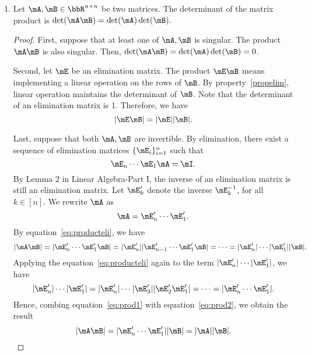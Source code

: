 \documentclass[11pt]{article}
\theoremstyle{plain}
\theoremstyle{definition}
\begin{document}
\begin{enumerate}
\begin{proof}
		($\Leftarrow$) If the determinant $\det(\mA) = 0$, the determinant of $RREF(\mA)$ is 0. Since the reduced row echelon form  of a matrix contains only distinct nonzero rows, the zero determinant implies that there exists at least one zero row in $RREF(\mA)$. Therefore, the matrix $\mA$ is singular.
	\end{proof}

	
	\item\label{propproduct} Let  $\mA, \mB \in \bbR^{n \times n}$ be two matrices. The determinant of the matrix product is $\det(\mA \mB) = \det(\mA) \det(\mB).$
	
	\begin{proof}
		First, suppose that at least one of $\mA, \mB$ is singular. The product $\mA \mB$ is also singular. Then, $\det(\mA \mB) = \det(\mA) \det(\mB) = 0$. 
		
		Second, let $\mE$ be an elimination matrix. The product $\mE \mB$ means implementing a linear operation on the rows of $\mB$. By property~\ref{propelim}, linear operation maintains the determinant of $\mB$. Note that the determinant of an elimination matrix is 1. Therefore, we have
		\begin{equation}\label{eq:producteli}
			|\mE \mB| = |\mE| |\mB|.
		\end{equation}
		
		Last, suppose that both $\mA, \mB$ are invertible. By elimination, there exist a sequence of elimination matrices $\{ \mE_i \}_{i = 1}^n$ such that 
		\[ \mE_n \cdots \mE_1 \mA = \mI.  \]
		By Lemma 2 in Linear Algebra-Part I, the inverse of an elimination matrix is still an elimination matrix. Let $\mE'_k$ denote the inverse $\mE^{-1}_k$, for all $k \in [n]$. We rewrite $\mA$ as
		\[ \mA = \mE'_n \cdots \mE'_1. \]
		By equation~\eqref{eq:producteli}, we have
		\begin{equation}\label{eq:prod1}
			|\mA \mB| = | \mE'_n \cdots \mE'_1 \mB | = |\mE'_n| |\mE'_{n-1} \cdots \mE'_1 \mB| = \cdots = |\mE'_n|\cdots |\mE'_1||\mB|. 
		\end{equation}
		Applying the equation~\eqref{eq:producteli} again to the term $|\mE'_n|\cdots |\mE'_1| $, we have
		\begin{equation}\label{eq:prod2}
			|\mE'_n|\cdots |\mE'_1|  =|\mE'_n|\cdots |\mE'_3| |\mE'_2 \mE'_1| = \cdots = | \mE'_n \cdots \mE'_1|.
		\end{equation}
		Hence, combing equation~\eqref{eq:prod1} with equation~\eqref{eq:prod2}, we obtain the result 
		\[ |\mA \mB|  = | \mE'_n \cdots \mE'_1| |\mB| = |\mA| |\mB|.\]
	\end{proof}
	

\end{enumerate}
\end{document}
